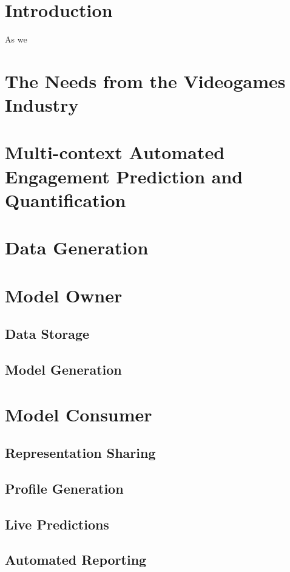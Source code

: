 \section{Introduction}
\label{industry_needs}
As we 

\section{The Needs from the Videogames Industry}
\label{industry_needs}
\lorem

\section{Multi-context Automated Engagement Prediction and Quantification}
\label{industry_needs}

\section{Data Generation}
\lorem
\section{Model Owner}
\lorem
\subsection{Data Storage}
\lorem
\subsection{Model Generation}
\lorem
\section{Model Consumer}
\lorem
\subsection{Representation Sharing}
\lorem
\subsection{Profile Generation}
\lorem
\subsection{Live Predictions}
\lorem
\subsection{Automated Reporting}
\lorem

